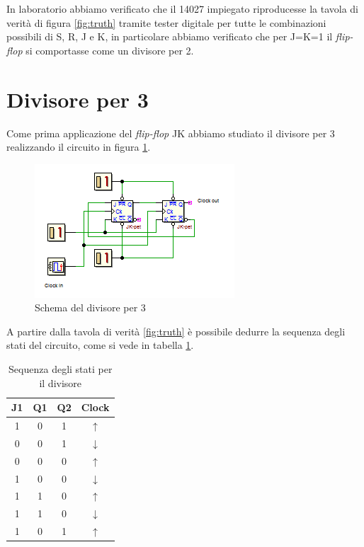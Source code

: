 \documentclass[journal, a4paper]{IEEEtran}
\begin{document}
In laboratorio abbiamo verificato che il 14027 impiegato riproducesse la tavola di verità di figura \ref{fig:truth} tramite tester digitale per tutte le combinazioni possibili di S, R, J e K, in particolare abbiamo verificato che per J=K=1 il \emph{flip-flop} si comportasse come un divisore per 2.

\section{Divisore per 3}

Come prima applicazione del \emph{flip-flop} JK abbiamo studiato il divisore per 3 realizzando il circuito in figura \ref{fig:div3}.

\begin{figure}[htp]
\centering
\includegraphics[scale=0.95]{es3}
\caption{Schema del divisore per 3}
\label{fig:div3}
\end{figure}

A partire dalla tavola di verità \ref{fig:truth} è possibile dedurre la sequenza degli stati del circuito, come si vede in tabella \ref{tab:div3}.

\begin{table}[htp]
\centering
\caption{Sequenza degli stati per il divisore}
\label{tab:div3}
\begin{tabular}{|c|c|c|c|}
\hline 
J1 & Q1 & Q2 & Clock \\ 
\hline 
1 & 0 & 1 & $\uparrow$ \\ 
\hline 
0 & 0 & 1 & $\downarrow$ \\ 
\hline 
0 & 0 & 0 & $\uparrow$ \\ 
\hline 
1 & 0 & 0 & $\downarrow$ \\ 
\hline 
1 & 1 & 0 & $\uparrow$ \\ 
\hline 
1 & 1 & 0 & $\downarrow$ \\ 
\hline 
1 & 0 & 1 & $\uparrow$ \\ 
\hline 
\end{tabular} 
\end{table}
\end{document}
